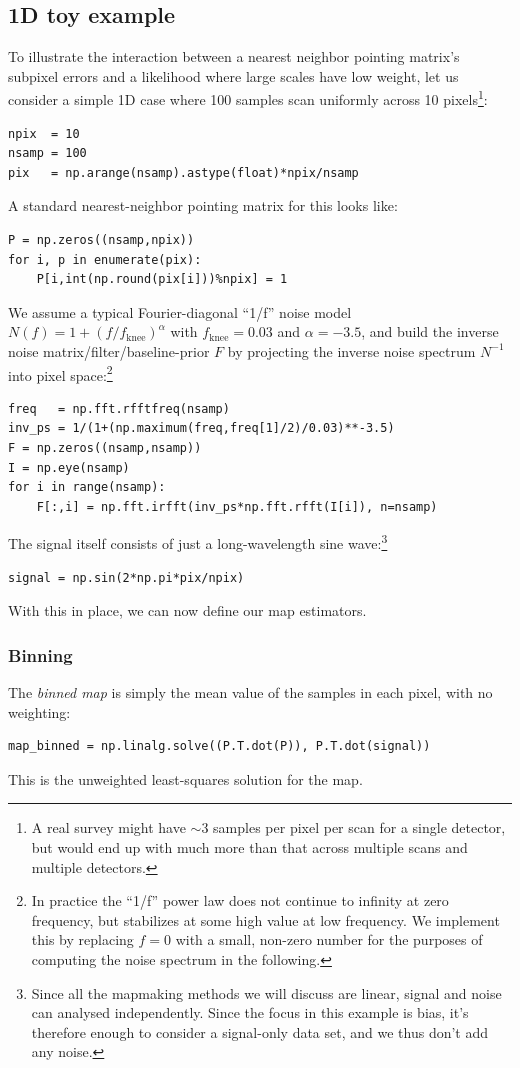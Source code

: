 \documentclass[twocolumn,apj]{aastex63}
\begin{document}
\subsection{1D toy example}
To illustrate the interaction between a nearest neighbor pointing matrix's
subpixel errors and a likelihood where large scales have low weight, let
us consider a simple 1D case where 100 samples scan uniformly across 10 pixels\footnote{
A real survey might have $\sim 3$ samples per pixel per scan for a single detector,
but would end up with much more than that across multiple scans and multiple detectors.}:
\begin{lstlisting}
npix  = 10
nsamp = 100
pix   = np.arange(nsamp).astype(float)*npix/nsamp
\end{lstlisting}
A standard nearest-neighbor pointing matrix for this looks like:
\begin{lstlisting}
P = np.zeros((nsamp,npix))
for i, p in enumerate(pix):
	P[i,int(np.round(pix[i]))%npix] = 1
\end{lstlisting}
We assume a typical Fourier-diagonal ``1/f'' noise model
$N(f) = 1+(f/f_\text{knee})^\alpha$
with $f_\text{knee}=0.03$ and $\alpha=-3.5$, and build the
inverse noise matrix/filter/baseline-prior $F$ by
projecting the inverse noise spectrum $N^{-1}$ into pixel space:\footnote{
	In practice the ``1/f'' power law does not continue to infinity at zero
	frequency, but stabilizes at some high value at low frequency. We implement
	this by replacing $f=0$ with a small, non-zero number for the purposes of
	computing the noise spectrum in the following.
}
\begin{lstlisting}
freq   = np.fft.rfftfreq(nsamp)
inv_ps = 1/(1+(np.maximum(freq,freq[1]/2)/0.03)**-3.5)
F = np.zeros((nsamp,nsamp))
I = np.eye(nsamp)
for i in range(nsamp):
	F[:,i] = np.fft.irfft(inv_ps*np.fft.rfft(I[i]), n=nsamp)
\end{lstlisting}
The signal itself consists of just a long-wavelength sine wave:\footnote{
Since all the mapmaking methods we will discuss are linear,
signal and noise can analysed independently. Since the focus
in this example is bias, it's therefore enough to consider a
signal-only data set, and we thus don't add any noise.}
\begin{lstlisting}
signal = np.sin(2*np.pi*pix/npix)
\end{lstlisting}

With this in place, we can now define our map estimators.

\subsubsection{Binning}
The \emph{binned map} is simply the mean value of the samples
in each pixel, with no weighting:
\begin{lstlisting}
map_binned = np.linalg.solve((P.T.dot(P)), P.T.dot(signal))
\end{lstlisting}
This is the unweighted least-squares solution for the map.
\end{document}
